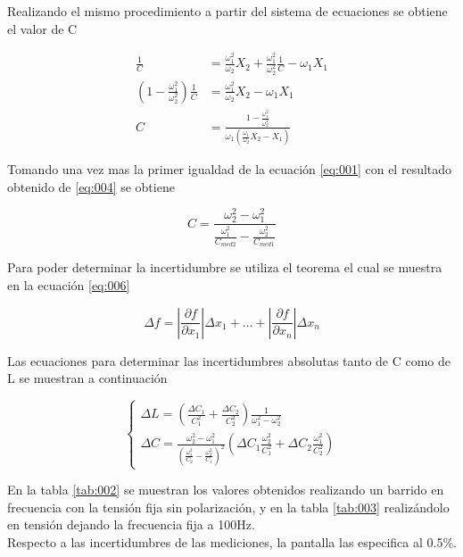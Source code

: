 \documentclass[a4paper,10pt]{article}
\begin{document}
		\indent Realizando el mismo procedimiento a partir del sistema de 
		ecuaciones se obtiene el valor de C

		\begin{align}\label{eq:004}
			\frac{1}{C} &= \frac{\omega_1^2}{\omega_2}X_2 + 
				\frac{\omega_1^2}{\omega_2^2}\frac{1}{C} - \omega_1X_1 \nonumber \\
			(1 - \frac{\omega_1^2}{\omega_2^2})\frac{1}{C} &= 
			\frac{\omega_1^2}{\omega_2}X_2 - \omega_1X_1 \nonumber \\
			C &= \frac{1 - \frac{\omega_1^2}{\omega_2^2}}
				{\omega_1(\frac{\omega_1}{\omega_2}X_2 - X_1)}
		\end{align}

		\indent Tomando una vez mas la primer igualdad de la ecuación 
		\ref{eq:001} con el resultado obtenido de \ref{eq:004} se obtiene

		\begin{equation}\label{eq:005}
			C = \frac{\omega_2^2 - \omega_1^2}
				{\frac{\omega_1^2}{C_{med2}} - \frac{\omega_2^2}{C_{med1}}}
		\end{equation}

		\indent Para poder determinar la incertidumbre se utiliza el teorema 
		el cual se muestra en la ecuación \ref{eq:006}

		\begin{equation}\label{eq:006}
			\Delta f = 	|\frac{\partial f}{\partial x_1}|\Delta x_1 + ... + 
						|\frac{\partial f}{\partial x_n}|\Delta x_n
		\end{equation}

		\indent Las ecuaciones para determinar las incertidumbres absolutas 
		tanto de C como de L se muestran a continuación

		\begin{equation}\label{eq:007}
			\begin{cases}
			\Delta L = (\frac{\Delta C_1}{C_1^2} + \frac{\Delta C_2}{C_2^2}) 
						\frac{1}{\omega_1^2 - \omega_2^2} \\ 
			\Delta C =  \frac{\omega_2^2 - \omega_1^2}{(\frac{\omega_1^2}{C_2} -
						\frac{\omega_2^2}{C_1})^2}(\Delta C_1\frac{\omega_2^2}
						{C_1^2} + \Delta C_2 \frac{\omega_1^2}{C_2^2})
			\end{cases}
		\end{equation}

		\indent En la tabla \ref{tab:002} se muestran los valores obtenidos 
		realizando un barrido en frecuencia con la tensión fija sin 
		polarización, y en la tabla \ref{tab:003} realizándolo en tensión 
		dejando la frecuencia fija a 100Hz. \\
		\indent Respecto a las incertidumbres de las mediciones, la pantalla las
		especifica al 0.5\%. 
\end{document}
